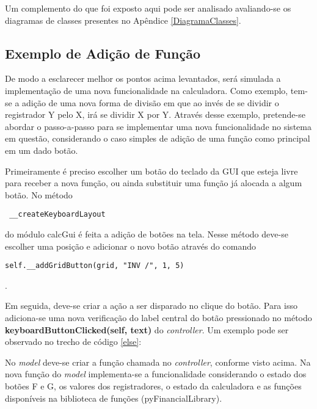 Um complemento do que foi exposto aqui pode ser analisado avaliando-se os diagramas de classes presentes no Apêndice \ref{DiagramaClasses}.

\subsection{Exemplo de Adição de Função}

De modo a esclarecer melhor os pontos acima levantados, será simulada a implementação de uma nova funcionalidade na calculadora. Como exemplo, tem-se a adição de uma nova forma de divisão em que ao invés de se dividir o registrador Y pelo X, irá se dividir X por Y. 
Através desse exemplo, pretende-se abordar o passo-a-passo para se implementar uma nova funcionalidade no sistema em questão, considerando o caso simples de adição de uma função como principal em um dado botão.

Primeiramente é preciso escolher um botão do teclado da GUI que esteja livre para receber a nova função, ou ainda substituir uma função já alocada a algum botão. No método \begin{verbatim} __createKeyboardLayout \end{verbatim} do módulo calcGui é feita a adição de botões na tela. Nesse método deve-se escolher uma posição e adicionar o novo botão através do comando \begin{verbatim}self.__addGridButton(grid, "INV /", 1, 5)\end{verbatim}.

Em seguida, deve-se criar a ação a ser disparado no clique do botão. Para isso adiciona-se uma nova verificação do label central do botão pressionado no método \textbf{keyboardButtonClicked(self, text)} do \textit{controller}. Um exemplo pode ser observado no trecho de código \ref{else}: 



No \textit{model} deve-se criar a função chamada no \textit{controller}, conforme visto acima. Na nova função do \textit{model} implementa-se a funcionalidade considerando o estado dos botões 
F e G, os valores dos registradores, o estado da calculadora e as funções disponíveis na biblioteca de funções (pyFinancialLibrary). 

